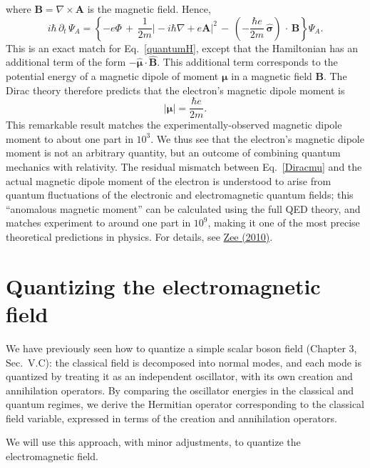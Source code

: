 \documentclass[pra,12pt]{revtex4}
\begin{document}
where $\mathbf{B} = \nabla\times\mathbf{A}$ is the magnetic field.
Hence,
\begin{equation}
  i\hbar\, \partial_t \, \Psi_A
  = \left\{-e\Phi
  \,+\, \frac{1}{2m} \big|-i\hbar\nabla +e\mathbf{A} \big|^2
  \,-\, \left(-\frac{\hbar e}{2m}\, \hat{\boldsymbol{\sigma}}\right)
  \,\cdot\, \mathbf{B} \right\} \Psi_A.
\end{equation}
This is an exact match for Eq.~\eqref{quantumH}, except that the
Hamiltonian has an additional term of the form $-
\hat{\boldsymbol{\mu}} \cdot \hat{\mathbf{B}}$.  This additional term
corresponds to the potential energy of a magnetic dipole of moment
$\boldsymbol{\mu}$ in a magnetic field $\mathbf{B}$.  The Dirac theory
therefore predicts that the electron's magnetic dipole moment is
\begin{equation}
  |\boldsymbol{\mu}| = \frac{\hbar e}{2m}.
  \label{Diracmu}
\end{equation}
This remarkable result matches the experimentally-observed magnetic
dipole moment to about one part in $10^3$.  We thus see that the
electron's magnetic dipole moment is not an arbitrary quantity, but an
outcome of combining quantum mechanics with relativity.  The residual
mismatch between Eq.~\eqref{Diracmu} and the actual magnetic dipole
moment of the electron is understood to arise from quantum
fluctuations of the electronic and electromagnetic quantum fields;
this ``anomalous magnetic moment'' can be calculated using the full
QED theory, and matches experiment to around one part in $10^9$,
making it one of the most precise theoretical predictions in physics.
For details, see \hyperref[cite:zee]{Zee (2010)}.

\section{Quantizing the electromagnetic field}
\label{sec:em_quantization}

We have previously seen how to quantize a simple scalar boson field
(Chapter 3, Sec.~V.C): the classical field is decomposed into normal
modes, and each mode is quantized by treating it as an independent
oscillator, with its own creation and annihilation operators.  By
comparing the oscillator energies in the classical and quantum
regimes, we derive the Hermitian operator corresponding to the
classical field variable, expressed in terms of the creation and
annihilation operators.

We will use this approach, with minor adjustments, to quantize the
electromagnetic field.
\end{document}
